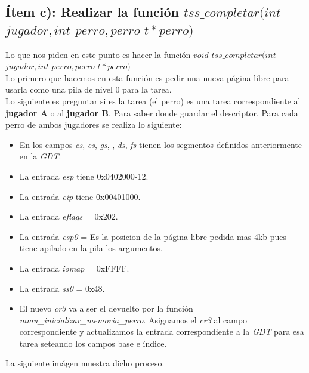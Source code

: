 \subsection{Ítem c): Realizar la función $tss\_completar(int$ $jugador, int$ $perro, perro\_t *perro)$}
Lo que nos piden en este punto es hacer la función $void$ $tss\_completar(int$ $jugador, int$ $perro, perro\_t *perro)$\\
Lo primero que  hacemos en esta función es pedir una nueva página libre para usarla como una pila de nivel 0 para la tarea.\\
Lo siguiente es preguntar si es la tarea (el perro) es una tarea correspondiente al \textbf{jugador A} o al \textbf{jugador B}. Para saber donde guardar el descriptor. Para cada perro de ambos jugadores se realiza lo siguiente:
\begin{itemize}

\item En los campos \textit{cs}, \textit{es}, \textit{gs}, , \textit{ds}, \textit{fs} tienen los segmentos definidos anteriormente en la \textit{GDT}.
\item La entrada \textit{esp} tiene 0x0402000-12.
\item La entrada \textit{eip} tiene 0x00401000.
\item La entrada \textit{eflags} = 0x202.
\item La entrada \textit{esp0} = Es la posicion de la página libre pedida mas 4kb pues tiene apilado en la pila los argumentos.
\item La entrada \textit{iomap} = 0xFFFF.
\item La entrada \textit{ss0} = 0x48.
\item El nuevo \textit{cr3} va a ser el devuelto por la función \textit{mmu\_inicializar\_memoria\_perro}. Asignamos el \textit{cr3}  al campo correspondiente y actualizamos la entrada correspondiente a la \textit{GDT} para esa tarea seteando los campos base e índice.
\end{itemize}

La siguiente imágen muestra dicho proceso.\\

